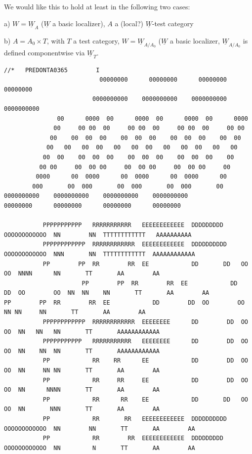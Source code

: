 We would like this to hold at least in the following two cases:

a) $W=\underline W_A$ ($\underline W$ a basic localizer), $A$ a (local?) $\underline W$-test category

b) $A=A_0\times T$,  with $T$ a test category, $W=\underline W_{A/A_0}$ ($\underline W$ a basic localizer, $\underline W_{A/A_0}$ is defined componentwise via $\underline W_T$.

{\fontsize{5}{6}\selectfont
\begin{verbatim}
//*   PREDONTA0365        I
                           00000000      00000000      00000000      00000000
                         0000000000    0000000000    0000000000    0000000000
               00      0000  00      0000  00      0000  00      0000
              00     00 00  00     00 00  00     00 00  00     00 00
             00    00  00  00    00  00  00    00  00  00    00  00
            00   00   00  00   00   00  00   00   00  00   00   00
           00  00    00  00  00    00  00  00    00  00  00    00
          00 00     00  00 00     00  00 00     00  00 00     00
         0000      00  0000      00  0000      00  0000      00
        000       00  000       00  000       00  000       00
0000000000    0000000000    0000000000    0000000000
00000000      00000000      00000000      00000000

           PPPPPPPPPPP   RRRRRRRRRRR   EEEEEEEEEEEE  DDDDDDDDD     OOOOOOOOOOOO  NN        NN  TTTTTTTTTTTT   AAAAAAAAAA
           PPPPPPPPPPPP  RRRRRRRRRRRR  EEEEEEEEEEEE  DDDDDDDDDD    OOOOOOOOOOOO  NNN       NN  TTTTTTTTTTTT  AAAAAAAAAAAA
           PP        PP  RR        RR  EE            DD       DD   OO        OO  NNNN      NN       TT       AA        AA
                      PP        PP  RR        RR  EE            DD        DD  OO        OO  NN  NN    NN       TT       AA        AA
PP        PP  RR        RR  EE            DD        DD  OO        OO  NN NN     NN       TT       AA        AA
           PPPPPPPPPPPP  RRRRRRRRRRRR  EEEEEEEE      DD        DD  OO        OO  NN   NN   NN       TT       AAAAAAAAAAAA
           PPPPPPPPPPP   RRRRRRRRRRR   EEEEEEEE      DD        DD  OO        OO  NN    NN  NN       TT       AAAAAAAAAAAA
           PP            RR    RR      EE            DD        DD  OO        OO  NN     NN NN       TT       AA        AA
           PP            RR     RR     EE            DD        DD  OO        OO  NN      NNNN       TT       AA        AA
           PP            RR      RR    EE            DD       DD   OO        OO  NN       NNN       TT       AA        AA
           PP            RR       RR   EEEEEEEEEEEE  DDDDDDDDDD    OOOOOOOOOOOO  NN        NN       TT       AA        AA
           PP            RR        RR  EEEEEEEEEEEE  DDDDDDDDD     OOOOOOOOOOOO  NN         N       TT       AA        AA


\end{verbatim}}
